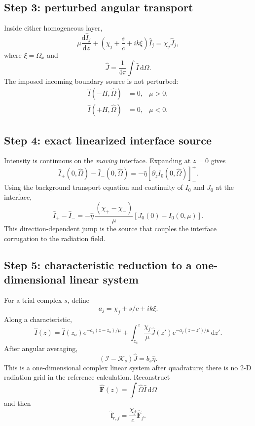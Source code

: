 \documentclass[11pt]{article}
\newcommand{\vect}[1]{\bm{#1}}
\newcommand{\Oh}{\hat{\Omega}}
\newcommand{\dd}{\mathrm{d}}
\newcommand{\Ihat}{\widehat I}
\newcommand{\Jhat}{\widehat J}
\newcommand{\Fhat}{\widehat{\vect F}}
\begin{document}
\subsection{Step 3: perturbed angular transport}
Inside either homogeneous layer,
\begin{equation}
\boxed{
\mu\frac{\dd\Ihat_j}{\dd z}+
\left(\chi_j+\frac{s}{c}+ik\xi\right)\Ihat_j
=\chi_j\Jhat_j,
}
\end{equation}
where $\xi=\Omega_x$ and
\begin{equation}
\Jhat=\frac{1}{4\pi}\int\Ihat\,\dd\Omega.
\end{equation}
The imposed incoming boundary source is not perturbed:
\begin{align}
\Ihat(-H,\Oh)&=0,&\mu>0,\\
\Ihat(+H,\Oh)&=0,&\mu<0.
\end{align}

\subsection{Step 4: exact linearized interface source}
Intensity is continuous on the \emph{moving} interface. Expanding at $z=0$ gives
\begin{equation}
\boxed{
\Ihat_+(0,\Oh)-\Ihat_-(0,\Oh)
=-\widehat\eta\left[\partial_z I_0(0,\Oh)\right]_-^+.
}
\end{equation}
Using the background transport equation and continuity of $I_0$ and $J_0$ at the interface,
\begin{equation}
\boxed{
\Ihat_+-\Ihat_-=
-\widehat\eta\,\frac{(\chi_+-\chi_-)}{\mu}\left[J_0(0)-I_0(0,\mu)\right].
}
\end{equation}
This direction-dependent jump is the source that couples the interface corrugation to the radiation field.

\subsection{Step 5: characteristic reduction to a one-dimensional linear system}
For a trial complex $s$, define
\begin{equation}
a_j=\chi_j+s/c+ik\xi.
\end{equation}
Along a characteristic,
\begin{equation}
\Ihat(z)=\Ihat(z_a)e^{-a_j(z-z_a)/\mu}
+\int_{z_a}^{z}\frac{\chi_j}{\mu}\Jhat(z')e^{-a_j(z-z')/\mu}\,\dd z'.
\end{equation}
After angular averaging,
\begin{equation}
\boxed{(\mathcal I-\mathcal K_s)\Jhat=b_s\widehat\eta.}
\end{equation}
This is a one-dimensional complex linear system after quadrature; there is no 2-D radiation grid in the reference calculation. Reconstruct
\begin{equation}
\Fhat(z)=\int\Oh\Ihat\,\dd\Omega
\end{equation}
and then
\begin{equation}
\widehat{\vect f}_{r,j}=\frac{\chi_j}{c}\Fhat_j.
\end{equation}
\end{document}
